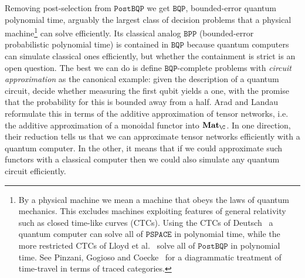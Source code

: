 Removing post-selection from $\mathtt{PostBQP}$ we get $\mathtt{BQP}$, bounded-error quantum polynomial time, arguably the largest class of decision problems that a physical machine\footnote
{By a physical machine we mean a machine that obeys the laws of quantum mechanics.
This excludes machines exploiting features of general relativity such as closed time-like curves (CTCs).
Using the CTCs of Deutsch~\cite{Deutsch91} a quantum computer can solve all of $\mathtt{PSPACE}$ in polynomial time, while the more restricted CTCs of Lloyd et al.~\cite{LloydEtAl11,LloydEtAl11a} solve all of $\mathtt{PostBQP}$ in polynomial time.
See Pinzani, Gogioso and Coecke~\cite{PinzaniEtAl19} for a diagrammatic treatment of time-travel in terms of traced categories.}
can solve efficiently.
Its classical analog $\mathtt{BPP}$ (bounded-error probabilistic polynomial time) is contained in $\mathtt{BQP}$ because quantum computers can simulate classical ones efficiently, but whether the containment is strict is an open question.
The best we can do is define $\mathtt{BQP}$-complete problems with \emph{circuit approximation} as the canonical example: given the description of a quantum circuit, decide whether measuring the first qubit yields a one, with the promise that the probability for this is bounded away from a half.
Arad and Landau~\cite{AradLandau10} reformulate this in terms of the additive approximation of tensor networks, i.e. the additive approximation of a monoidal functor into $\mathbf{Mat}_\C$.
In one direction, their reduction tells us that we can approximate tensor networks efficiently with a quantum computer.
In the other, it means that if we could approximate such functors with a classical computer then we could also simulate any quantum circuit efficiently.

